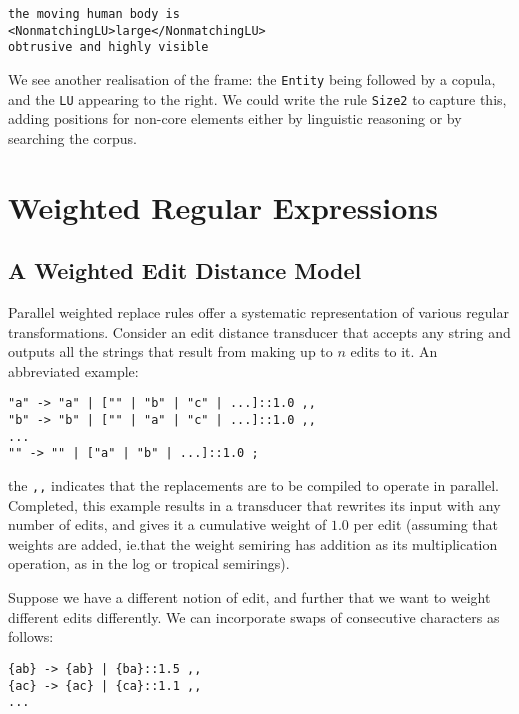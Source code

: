 \documentclass{llncs}
\begin{document}
\small
\begin{framed}
\begin{verbatim}
the moving human body is
<NonmatchingLU>large</NonmatchingLU>
obtrusive and highly visible
\end{verbatim}
\end{framed}
\normalsize

We see another realisation of the frame: the \verb+Entity+ being followed by a
copula, and the \verb+LU+ appearing to the right. We could write the rule
\verb+Size2+ to capture this, adding positions for non-core elements either by
linguistic reasoning or by searching the corpus.


\section{Weighted Regular Expressions}

\subsection{A Weighted Edit Distance Model}

Parallel weighted replace rules offer a systematic representation of various
regular transformations. Consider an edit distance transducer that accepts
any string and outputs all the strings that result from making up to $n$ edits
to it. An abbreviated example:

\begin{framed}
\begin{verbatim}
"a" -> "a" | ["" | "b" | "c" | ...]::1.0 ,,
"b" -> "b" | ["" | "a" | "c" | ...]::1.0 ,,
...
"" -> "" | ["a" | "b" | ...]::1.0 ;
\end{verbatim}
\end{framed}

the \verb+,,+ indicates that the replacements are to be compiled to operate
in parallel. Completed, this example results in a transducer that rewrites
its input with any number of edits, and gives it a cumulative weight of
$1.0$ per edit (assuming that weights are added, ie.\@ that the weight semiring
has addition as its multiplication operation, as in the log or tropical
semirings).

Suppose we have a different notion of edit, and further that we want to weight
different edits differently. We can incorporate swaps of consecutive
characters as follows:

\begin{framed}
\begin{verbatim}
{ab} -> {ab} | {ba}::1.5 ,,
{ac} -> {ac} | {ca}::1.1 ,,
... 
\end{verbatim}
\end{framed}
\end{document}
